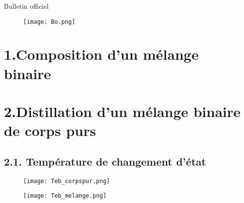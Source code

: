 \documentclass{beamer}
\begin{document}
\maketitle

\begin{frame}{Bulletin officiel}
    \begin{figure}
        \centering
        \texttt{[image: Bo.png]}
    \end{figure}
\end{frame}

\begin{frame}
    \tableofcontents
\end{frame}

\section{1.Composition d'un mélange binaire}

\section{2.Distillation d'un mélange binaire de corps purs}

\subsection{2.1. Température de changement d'état}

\begin{frame}{}
    \begin{figure}
        \centering
        \texttt{[image: Teb\_corpspur.png]}
    \end{figure}
\end{frame}

\begin{frame}{}
    \begin{figure}
        \centering
        \texttt{[image: Teb\_melange.png]}
    \end{figure}
\end{frame}
\end{document}
